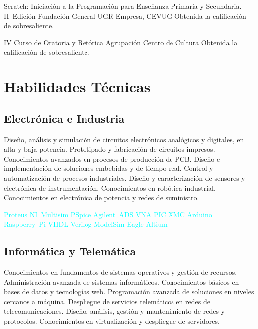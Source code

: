 \documentclass[11pt,a4paper,sans,spanish]{moderncv}
\begin{document}
{Scratch: Iniciación a la Programación para Enseñanza Primaria y Secundaria. II~Edición}
{Fundación General UGR-Empresa, CEVUG}{}{}
{Obtenida la calificación de sobresaliente.}

{IV Curso de Oratoria y Retórica}
{Agrupación Centro de Cultura}{}{}
{Obtenida la calificación de sobresaliente.}


\section{Habilidades Técnicas}

\subsection{Electrónica e Industria}
{Diseño, análisis y simulación de circuitos electrónicos analógicos y digitales, en alta y baja potencia.}\quad{}
Prototipado y fabricación de circuitos impresos.\quad{}
{Conocimientos avanzados en procesos de producción de PCB.}\quad{} 
Diseño e implementación de soluciones embebidas y de tiempo real.\quad
{Control y automatización de procesos industriales.}\quad
Diseño y caracterización de sensores y electrónica de instrumentación.\quad
{Conocimientos en robótica industrial.}\quad
{Conocimientos en electrónica de potencia y redes de suministro.}

\begin{center}
\textcolor{cyan}{
Proteus \quad{} NI~Multisim \quad{} PSpice \quad{}
Agilent~ADS \quad{} VNA \quad{}
PIC \quad{} XMC \quad{} Arduino \quad{} Raspberry~Pi \quad{}
VHDL \quad{} Verilog \quad{} ModelSim \quad{}
Eagle \quad{} Altium
}
\end{center}

\subsection{Informática y Telemática}
{Conocimientos en fundamentos de sistemas operativos y gestión de recursos.}\quad
{Administración avanzada de sistemas informáticos.}\quad
{Conocimientos básicos en bases de datos y tecnologías web.}\quad
{Programación avanzada de soluciones en niveles cercanos a máquina.}\quad
{Despliegue de servicios telemáticos en redes de telecomunicaciones. }\quad
{Diseño, análisis, gestión y mantenimiento de redes y protocolos.}\quad
{Conocimientos en virtualización y despliegue de servidores.}\quad
\end{document}
